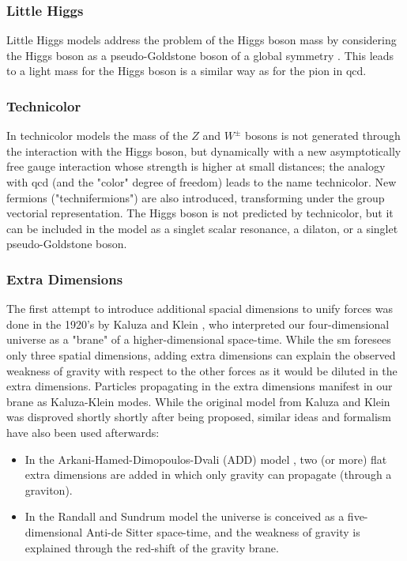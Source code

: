 \subsubsection*{Little Higgs}
Little Higgs models address the problem of the Higgs boson mass by considering the Higgs boson as a pseudo-Goldstone boson of a global symmetry \cite{PhysRevD.12.508, Kaplan:1983fs, KAPLAN1984187, DUGAN1985299}. This leads to a light mass for the Higgs boson is a similar way as for the pion in \gls{qcd}.

\subsubsection*{Technicolor}
In technicolor models \cite{Weinberg:1975gm, PhysRevD.20.2619} the mass of the $Z$ and $W^{\pm}$ bosons is not generated through the interaction with the Higgs boson, but dynamically with a new asymptotically free gauge interaction whose strength is higher at small distances; the analogy with \gls{qcd} (and the "color" degree of freedom) leads to the name technicolor. New fermions ("technifermions") are also introduced, transforming under the group vectorial representation. The Higgs boson is not predicted by technicolor, but it can be included in the model as a singlet scalar resonance, a dilaton, or a singlet pseudo-Goldstone boson.

\subsubsection*{Extra Dimensions}

The first attempt to introduce additional spacial dimensions to unify forces was done in the 1920's by Kaluza and Klein \cite{Kaluza, Klein:1926tv}, who interpreted our four-dimensional universe as a "brane" of a higher-dimensional space-time. While the \gls{sm} foresees only three spatial dimensions, adding extra dimensions can explain the observed weakness of gravity with respect to the other forces as it would be diluted in the extra dimensions. 
Particles propagating in the extra dimensions manifest in our brane as Kaluza-Klein modes. %
While the original model from Kaluza and Klein was disproved shortly shortly after being proposed, similar ideas and formalism have also been used afterwards:  

\begin{itemize}
\item In the Arkani-Hamed-Dimopoulos-Dvali (ADD) model \cite{ArkaniHamed:1998rs}, two (or more) flat extra dimensions are added in which only gravity can propagate (through a graviton).
\item In the Randall and Sundrum model \cite{PhysRevLett.83.3370} the universe is conceived as a five-dimensional Anti-de Sitter space-time, and the weakness of gravity is explained through the red-shift of the gravity brane.
\end{itemize}


